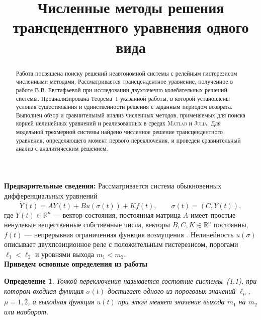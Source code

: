 \documentclass[12pt,a4paper]{article}
\title{Численные методы решения\\ трансцендентного уравнения одного вида}
\author{}
\date{}
\theoremstyle{bigplain}
\theoremstyle{plain}
\newtheorem{definition}{Определение}
\begin{document}
\maketitle

\begin{abstract}
Работа посвящена поиску решений неавтономной системы
с релейным гистерезисом численными методами.
Рассматривается трансцендентное уравнение,
полученное в работе В.В. Евстафьевой при исследовании
 двухточечно-колебательных
решений системы.
Проанализирована Теорема~1 указанной работы,
в которой установлены  условия существования и единственности
решения с заданным периодом возврата.
Выполнен обзор и сравнительный анализ численных методов, применяемых для 
поиска корней нелинейных уравнений и 
реализованных в средах \textsc{Matlab} и \textsc{Julia}.
Для модельной трехмерной системы найдено численное решение трансцендентного уравнения,
определяющего момент первого переключения, и проведен сравнительный анализ с аналитическим решением.
\end{abstract}

\vspace{2\baselineskip}

\noindent\textbf{Предварительные сведения: }
Рассматривается система обыкновенных дифференциальных уравнений
\begin{equation}
\dot Y(t)=AY(t)+Bu(\sigma(t))+Kf(t),\qquad
\sigma(t)=(C,Y(t)),
\tag{1.1}
\label{eq:system}
\end{equation}
где $Y(t)\in\mathbb{R}^n$ — вектор состояния, постоянная матрица $A$ имеет простые ненулевые вещественные собственные числа,
векторы $B,C,K\in\mathbb{R}^n$ постоянны,
$f(t)$ — непрерывная ограниченная функция возмущения .
Нелинейность $u(\sigma)$ описывает двухпозиционное реле
с положительным гистерезисом, порогами $\ell_1<\ell_2$
и уровнями выхода $m_1<m_2$.\\

\noindent\textbf{Приведем основные определения из работы } \cite{Eustafieva}
\vspace{-0.5\baselineskip}



\begin{definition}
Точкой переключения называется состояние системы~(1.1), 
при котором входная функция $\sigma(t)$ достигает одного из пороговых значений 
$\ell_\mu$, $\mu=1,2$, а выходная функция $u(t)$ при этом меняет значение 
выхода $m_1$ на $m_2$ или наоборот.
\end{definition}
\end{document}
